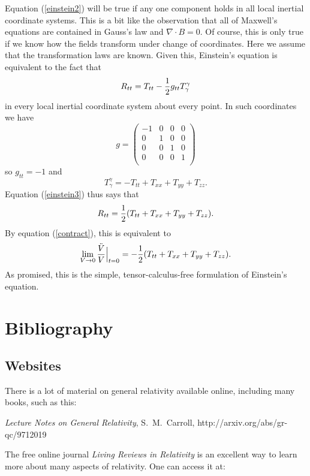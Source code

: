 Equation (\ref{einstein2}) will be true if any one component holds in
all local inertial coordinate systems.  This is a bit like the
observation that all of Maxwell's equations are contained in Gauss's law
and $\nabla \cdot B = 0$.  Of course, this is only true if we
know how the fields transform under change of coordinates.  Here we
assume that the transformation laws are known.  Given this, Einstein's
equation is equivalent to the fact that 
\begin{equation}   R_{tt} = T_{tt} - {1\over 2}g_{tt} T^\gamma_\gamma 
\label{einstein3} \end{equation}
in every local inertial coordinate system about every point.  In
such coordinates we have 
\begin{equation}  g =  \left( \begin{array}{cccc} 
                 -1 & 0 &0 & 0  \\ 
                 0     & 1 &0 & 0  \\
                 0     & 0 &1 & 0  \\
                 0     & 0 &0 & 1  \\
\end{array}\right)
\label{standard}
\end{equation}
so $g_{tt} = -1$ and 
\[   T^\gamma_\gamma = -T_{tt} + T_{xx} + T_{yy} + T_{zz}. \]
Equation (\ref{einstein3}) thus says that
\[   R_{tt} = {1\over 2} (T_{tt} + T_{xx} + T_{yy} + T_{zz}) .\]
By equation (\ref{contract}), this is equivalent to
\[  \lim_{V \to 0} {\ddot V\over V}\Bigr|_{t = 0} = 
- {1\over 2} (T_{tt} + T_{xx} + T_{yy} + T_{zz}). \]
As promised, this is the simple, tensor-calculus-free formulation 
of Einstein's
equation.



\section{Bibliography}

\subsection*{Websites}

There is a lot of material on general relativity available online,
including many books, such as this:

\medskip
\noindent
{\it Lecture Notes on General Relativity}, S.\ M.\ Carroll, \hfill
\break http://arxiv.org/abs/gr-qc/9712019

\medskip 
\noindent
The free online journal {\it Living Reviews in Relativity} is
an excellent way to learn more about many aspects of relativity.
One can access it at:

